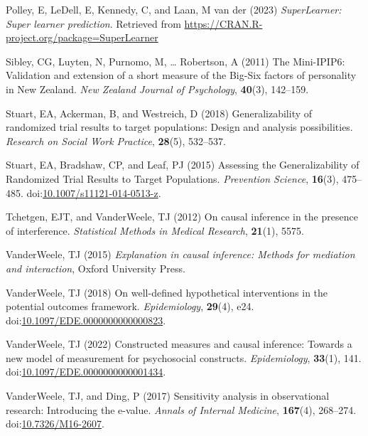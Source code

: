 \documentclass[
  singlecolumn]{article}
\newlength{\cslhangindent}
\newenvironment{CSLReferences}[2] %
 {\begin{list}{}{%
  \setlength{\itemindent}{0pt}
  \setlength{\leftmargin}{0pt}
  \setlength{\parsep}{0pt}
  \ifodd #1
   \setlength{\leftmargin}{\cslhangindent}
   \setlength{\itemindent}{-1\cslhangindent}
  \fi
  \setlength{\itemsep}{#2\baselineskip}}}
 {\end{list}}
\begin{document}
\begin{CSLReferences}{1}{0}
Polley, E, LeDell, E, Kennedy, C, and Laan, M van der (2023)
\emph{SuperLearner: Super learner prediction}. Retrieved from
\url{https://CRAN.R-project.org/package=SuperLearner}

Sibley, CG, Luyten, N, Purnomo, M, \ldots{} Robertson, A (2011) The
Mini-IPIP6: Validation and extension of a short measure of the Big-Six
factors of personality in New Zealand. \emph{New Zealand Journal of
Psychology}, \textbf{40}(3), 142--159.

Stuart, EA, Ackerman, B, and Westreich, D (2018) Generalizability of
randomized trial results to target populations: Design and analysis
possibilities. \emph{Research on Social Work Practice}, \textbf{28}(5),
532--537.

Stuart, EA, Bradshaw, CP, and Leaf, PJ (2015) Assessing the
Generalizability of Randomized Trial Results to Target Populations.
\emph{Prevention Science}, \textbf{16}(3), 475--485.
doi:\href{https://doi.org/10.1007/s11121-014-0513-z}{10.1007/s11121-014-0513-z}.

Tchetgen, EJT, and VanderWeele, TJ (2012) On causal inference in the
presence of interference. \emph{Statistical Methods in Medical
Research}, \textbf{21}(1), 5575.

VanderWeele, TJ (2015) \emph{Explanation in causal inference: Methods
for mediation and interaction}, Oxford University Press.

VanderWeele, TJ (2018) On well-defined hypothetical interventions in the
potential outcomes framework. \emph{Epidemiology}, \textbf{29}(4), e24.
doi:\href{https://doi.org/10.1097/EDE.0000000000000823}{10.1097/EDE.0000000000000823}.

VanderWeele, TJ (2022) Constructed measures and causal inference:
Towards a new model of measurement for psychosocial constructs.
\emph{Epidemiology}, \textbf{33}(1), 141.
doi:\href{https://doi.org/10.1097/EDE.0000000000001434}{10.1097/EDE.0000000000001434}.

VanderWeele, TJ, and Ding, P (2017) Sensitivity analysis in
observational research: Introducing the e-value. \emph{Annals of
Internal Medicine}, \textbf{167}(4), 268--274.
doi:\href{https://doi.org/10.7326/M16-2607}{10.7326/M16-2607}.


\end{CSLReferences}
\end{document}
